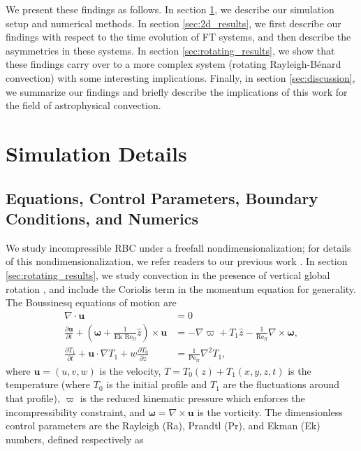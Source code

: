 \documentclass[aps, pre, onecolumn, nofootinbib, notitlepage, groupedaddress, amsfonts, amssymb, amsmath, longbibliography, superscriptaddress]{revtex4-1}
\newcommand{\DivU}{\ensuremath{\nabla\cdot\bm{u}}}
\newcommand{\grad}{\ensuremath{\nabla}}
\newcommand{\RB}{Rayleigh-B\'{e}nard }
\newcommand{\Reff}{\ensuremath{\text{Re}_{\text{ff}}}}
\newcommand{\Peff}{\ensuremath{\text{Pe}_{\text{ff}}}}
\newcommand{\ea}[1]{{\color{red} #1}}
\begin{document}
We present these findings as follows.
In section \ref{sec:simulations}, we describe our simulation setup and numerical methods.
In section \ref{sec:2d_results}, we first describe our findings with respect to the time evolution of FT systems, and then describe the asymmetries in these systems.
In section \ref{sec:rotating_results}, we show that these findings carry over to a more complex system (rotating \RB convection) with some interesting implications.
Finally, in section \ref{sec:discussion}, we summarize our findings and briefly describe the implications of this work for the field of astrophysical convection.

\section{Simulation Details}
\label{sec:simulations}
\ea{
\subsection{Equations, Control Parameters, Boundary Conditions, and Numerics}
}
We study incompressible RBC under a freefall nondimensionalization; for details of this nondimensionalization, we refer readers to our previous work \cite{anders&all2018}.
In section \ref{sec:rotating_results}, we study convection in the presence of vertical global rotation \cite{julien&all1996}, and include the Coriolis term in the momentum equation for generality.
The Boussinesq equations of motion are
\begin{align}
\DivU &= 0
	\label{eqn:incompressible}
\\
\frac{\partial \bm{u}}{\partial t} + \left(\bm{\omega} + \frac{1}{\text{Ek }\Reff}\hat{z}\right)\times\bm{u} 
&= - \grad \varpi + T_1\hat{z} - \frac{1}{\Reff}\grad\times\bm{\omega},
	\label{eqn:bouss_momentum}
\\
\frac{\partial T_1}{\partial t}  + \bm{u}\cdot\grad T_1 + w \frac{\partial T_0}{\partial z} 
&= \frac{1}{\Peff}\grad^2 T_1,
	\label{eqn:bouss_energy}
\end{align}
where $\bm{u} = (u, v, w)$ is the velocity, $T = T_0(z) + T_1(x, y, z, t)$ is the temperature (where $T_0$ is the initial profile and $T_1$ are the fluctuations around that profile), $\varpi$ is the reduced kinematic pressure \cite{anders&all2018} which enforces the incompressibility constraint, and $\bm{\omega} = \grad \times \bm{u}$ is the vorticity.
The dimensionless control parameters are the Rayleigh (Ra), Prandtl (Pr), and Ekman (Ek) numbers, defined respectively as
\end{document}
